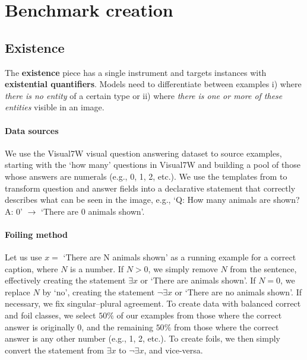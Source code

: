 \documentclass[11pt]{article}
\begin{document}



\clearpage
\appendix

\section{Benchmark creation}\label{app:benchmark}

\subsection{Existence}\label{app:existence}

The {\bf existence} piece has a single instrument and targets instances with \textbf{existential quantifiers}.
Models need to differentiate between examples i) where \textit{there is no entity} of a certain type or ii) where \textit{there is one or more of these entities} visible in an image.

\paragraph{Data sources}
We use the Visual7W visual question answering dataset \citep{zhu2016cvpr} to source examples, starting with the `how many' questions in Visual7W and building a pool of those whose answers are numerals (e.g., 0, 1, 2, etc.).
We use the templates from \citet{parcalabescu2021seeing} to transform question and answer fields into a declarative statement that correctly describes what can be seen in the image, e.g., `Q: How many animals are shown? A: 0' $\rightarrow$ `There are 0 animals shown'.

\paragraph{Foiling method}
Let us use $x =$  `There are N animals shown' as a running example for a correct caption, where $N$ is a number.
If $N>0$, we simply remove $N$ from the sentence, effectively creating the statement $\exists x$ or `There are animals shown'.
If $N=0$, we replace $N$ by `no', creating the statement $\neg\exists x$ or `There are no animals shown'.
If necessary, we fix singular--plural agreement.
To create data with balanced correct and foil classes, we select $50\%$ of our examples from those where the correct answer is originally 0, and the remaining $50\%$ from those where the correct answer is any other number (e.g., 1, 2, etc.).
To create foils, we then simply convert the statement from $\exists x$ to $\neg\exists x$, and vice-versa.
\end{document}

